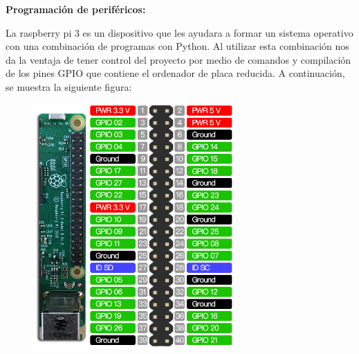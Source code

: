\documentclass[12pt]{article}
\begin{document}
\par


\vspace{\baselineskip}

\vspace{\baselineskip}

\vspace{\baselineskip}

\vspace{\baselineskip}

\vspace{\baselineskip}

\vspace{\baselineskip}

\vspace{\baselineskip}

\vspace{\baselineskip}
\newpage
\textbf{Programación de periféricos:}\par








La raspberry pi 3 es un dispositivo que les ayudara a formar un sistema operativo con una combinación de programas con Python. Al utilizar esta combinación nos da la ventaja de tener control del proyecto por medio de comandos y compilación de los pines GPIO que contiene el ordenador de placa reducida. A continuación, se muestra la siguiente figura:

\begin{figure}[H]
\advance\leftskip 0.82in		\includegraphics[width=3.06in,height=3.68in]{./media/image5.png}
\end{figure}
\end{document}
